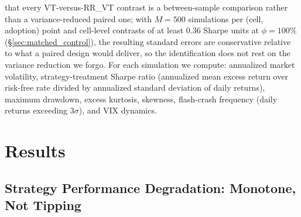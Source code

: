 \documentclass[12pt,a4paper]{article}
\begin{document}
that every VT-versus-RR\_VT contrast is a between-sample comparison rather than a variance-reduced paired one; with $M = 500$ simulations per (cell, adoption) point and cell-level contrasts of at least 0.36 Sharpe units at $\phi = 100\%$ (\S\ref{sec:matched_control}), the resulting standard errors are conservative relative to what a paired design would deliver, so the identification does not rest on the variance reduction we forgo. For each simulation we compute: annualized market volatility, strategy-treatment Sharpe ratio (annualized mean excess return over risk-free rate divided by annualized standard deviation of daily returns), maximum drawdown, excess kurtosis, skewness, flash-crash frequency (daily returns exceeding $3\sigma$), and VIX dynamics.

\section{Results}
\label{sec:results}

\subsection{Strategy Performance Degradation: Monotone, Not Tipping}
\label{sec:degradation_monotone}
\end{document}
